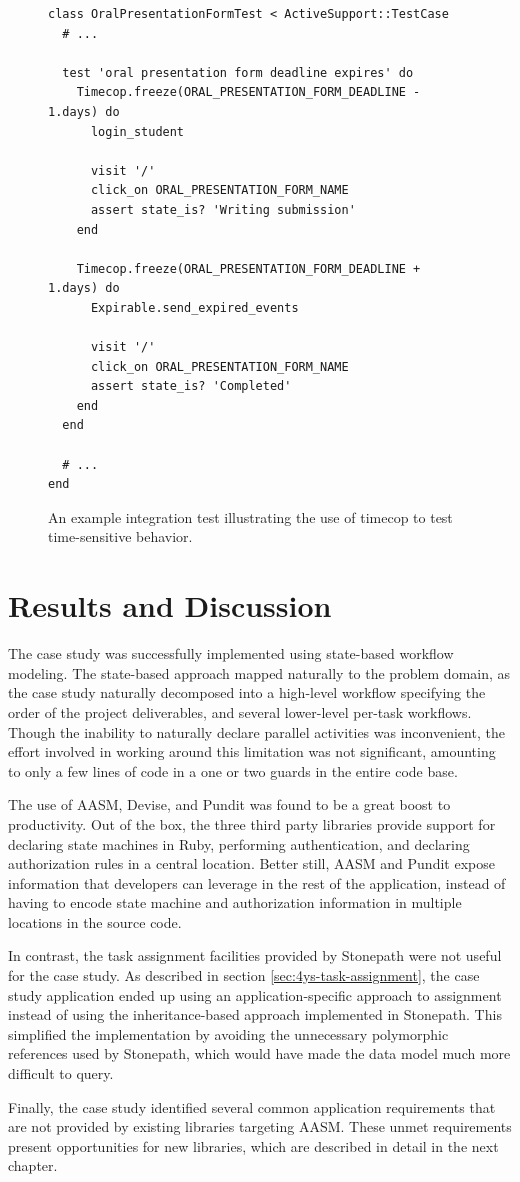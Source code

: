 \documentclass[document.tex]{subfiles}
\begin{document}
\begin{figure}[!ht]
  \begin{lstlisting}
class OralPresentationFormTest < ActiveSupport::TestCase
  # ...

  test 'oral presentation form deadline expires' do
    Timecop.freeze(ORAL_PRESENTATION_FORM_DEADLINE - 1.days) do
      login_student

      visit '/'
      click_on ORAL_PRESENTATION_FORM_NAME
      assert state_is? 'Writing submission'
    end

    Timecop.freeze(ORAL_PRESENTATION_FORM_DEADLINE + 1.days) do
      Expirable.send_expired_events

      visit '/'
      click_on ORAL_PRESENTATION_FORM_NAME
      assert state_is? 'Completed'
    end
  end

  # ...
end
  \end{lstlisting}
  \cprotect \caption{An example integration test illustrating the use of timecop to test time-sensitive behavior.}
  \label{fig:4ys-test-timecop}
\end{figure}


\section {Results and Discussion}

The case study was successfully implemented using state-based workflow modeling. The state-based approach mapped naturally to the problem domain, as the case study naturally decomposed into a high-level workflow specifying the order of the project deliverables, and several lower-level per-task workflows.
Though the inability to naturally declare parallel activities was inconvenient, the effort involved in working around this limitation was not significant, amounting to only a few lines of code in a one or two guards in the entire code base.

The use of AASM, Devise, and Pundit was found to be a great boost to productivity. Out of the box, the three third party libraries provide support for declaring state machines in Ruby, performing authentication, and declaring authorization rules in a central location. Better still, AASM and Pundit expose information that developers can leverage in the rest of the application, instead of having to encode state machine and authorization information in multiple locations in the source code.

In contrast, the task assignment facilities provided by Stonepath were not useful for the case study. As described in section \ref{sec:4ys-task-assignment}, the case study application ended up using an application-specific approach to assignment instead of using the inheritance-based approach implemented in Stonepath. This simplified the implementation by avoiding the unnecessary polymorphic references used by Stonepath, which would have made the data model much more difficult to query.

Finally, the case study identified several common application requirements that are not provided by existing libraries targeting AASM. These unmet requirements present opportunities for new libraries, which are described in detail in the next chapter.
\end{document}
